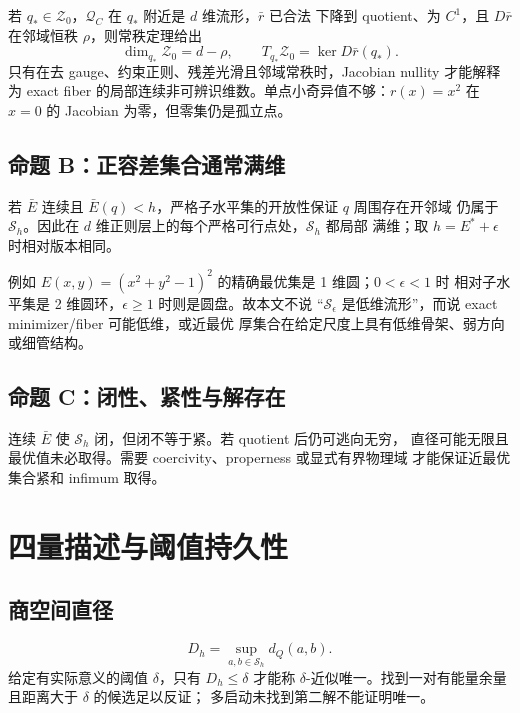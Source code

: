 \documentclass[UTF8,a4paper,11pt]{ctexart}
\newcommand{\Sset}{\mathcal S}
\newcommand{\Qspace}{\mathcal Q}
\begin{document}
若 $q_*\in\mathcal Z_0$，$\Qspace_C$ 在 $q_*$ 附近是 $d$ 维流形，$\bar r$ 已合法
下降到 quotient、为 $C^1$，且
$D\bar r$ 在邻域恒秩 $\rho$，则常秩定理给出
\begin{equation}
  \dim_{q_*}\mathcal Z_0=d-\rho,
  \qquad T_{q_*}\mathcal Z_0=\ker D\bar r(q_*).
  \label{eq:fiber-dimension}
\end{equation}
只有在去 gauge、约束正则、残差光滑且邻域常秩时，Jacobian nullity 才能解释
为 exact fiber 的局部连续非可辨识维数。单点小奇异值不够：$r(x)=x^2$ 在
$x=0$ 的 Jacobian 为零，但零集仍是孤立点。

\subsection{命题 B：正容差集合通常满维}

若 $\bar E$ 连续且 $\bar E(q)<h$，严格子水平集的开放性保证 $q$ 周围存在开邻域
仍属于 $\Sset_h$。因此在 $d$ 维正则层上的每个严格可行点处，$\Sset_h$ 都局部
满维；取 $h=E^*+\epsilon$ 时相对版本相同。

例如 $E(x,y)=(x^2+y^2-1)^2$ 的精确最优集是 1 维圆；$0<\epsilon<1$ 时
相对子水平集是 2 维圆环，$\epsilon\ge1$ 时则是圆盘。故本文不说
“$\Sset_\epsilon$ 是低维流形”，而说 exact minimizer/fiber 可能低维，或近最优
厚集合在给定尺度上具有低维骨架、弱方向或细管结构。

\subsection{命题 C：闭性、紧性与解存在}

连续 $\bar E$ 使 $\Sset_h$ 闭，但闭不等于紧。若 quotient 后仍可逃向无穷，
直径可能无限且最优值未必取得。需要 coercivity、properness 或显式有界物理域
才能保证近最优集合紧和 infimum 取得。

\section{四量描述与阈值持久性}

\subsection{商空间直径}

\begin{equation}
  D_h=\sup_{a,b\in\Sset_h}d_Q(a,b).
  \label{eq:diameter}
\end{equation}
给定有实际意义的阈值 $\delta$，只有 $D_h\le\delta$ 才能称
$\delta$-近似唯一。找到一对有能量余量且距离大于 $\delta$ 的候选足以反证；
多启动未找到第二解不能证明唯一。
\end{document}
